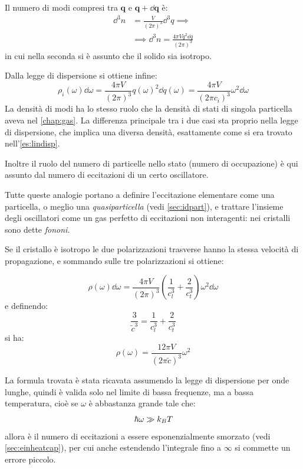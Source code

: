 Il numero di modi compresi tra $ \textbf{q} $ e $ \textbf{q} + \dd \textbf{q} $ è:
\begin{align*}
	\dd^3 n &= \frac{V}{(2\pi)^3} \dd^3 q \implies\\
	&\implies \dd^3 n = \frac{4\pi V q^2 \dd q}{(2\pi)^3}
\end{align*}
in cui nella seconda si è assunto che il solido sia isotropo.

Dalla legge di dispersione si ottiene infine:
\begin{equation*}
	\rho_i(\omega) \dd \omega = \frac{4\pi V}{(2\pi)^3} q(\omega)^2 \dd q(\omega) = \frac{4\pi V}{(2\pi c_i)^3} \omega^2 \dd \omega
\end{equation*}
La densità di modi ha lo stesso ruolo che la densità di stati di singola particella aveva nel \cref{chap:gas}. La differenza principale tra i due casi sta proprio nella legge di dispersione, che implica una diversa densità, esattamente come si era trovato nell'\cref{es:lindisp}.

Inoltre il ruolo del numero di particelle nello stato (numero di occupazione) è qui assunto dal numero di eccitazioni di un certo oscillatore.

Tutte queste analogie portano a definire l'eccitazione elementare come una particella, o meglio una \textit{quasiparticella} (vedi \cref{sec:idpart}), e trattare l'insieme degli oscillatori come un gas perfetto di eccitazioni non interagenti: nei cristalli sono dette \textit{fononi}.
\newline

Se il cristallo è isotropo le due polarizzazioni trasverse hanno la stessa velocità di propagazione, e sommando sulle tre polarizzazioni si ottiene:

\begin{equation*}
\rho(\omega) \dd \omega = \frac{4\pi V}{(2\pi)^3}\left(\frac{1}{c_l^3} + \frac{2}{c_t^3}\right) \omega^2 \dd \omega
\end{equation*}
e definendo:
\begin{equation*}
	\frac{3}{\tilde{c}^3} = \frac{1}{c_l^3} + \frac{2}{c_t^3}
\end{equation*}
si ha:
\begin{equation*}
\rho(\omega)= \frac{12\pi V}{(2\pi\tilde{c})^3}\omega^2 
\end{equation*}

La formula trovata è stata ricavata assumendo la legge di dispersione per onde lunghe, quindi è valida solo nel limite di bassa frequenze, ma a bassa temperatura, cioè se $ \omega $ è abbastanza grande tale che:
\begin{equation*}
\hbar \omega \gg k_B T
\end{equation*}
allora è il numero di eccitazioni a essere esponenzialmente smorzato (vedi \cref{sec:einheatcap}), per cui anche estendendo l'integrale fino a $ \infty $ si commette un errore piccolo.

